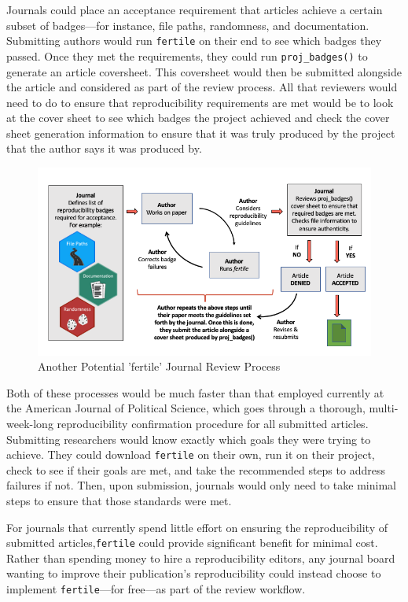 \documentclass[12pt,twoside]{reedthesis}
\begin{document}
Journals could place an acceptance requirement that articles achieve a
certain subset of badges---for instance, file paths, randomness, and
documentation. Submitting authors would run \texttt{fertile} on their
end to see which badges they passed. Once they met the requirements,
they could run \texttt{proj\_badges()} to generate an article
coversheet. This coversheet would then be submitted alongside the
article and considered as part of the review process. All that reviewers
would need to do to ensure that reproducibility requirements are met
would be to look at the cover sheet to see which badges the project
achieved and check the cover sheet generation information to ensure that
it was truly produced by the project that the author says it was
produced by.
\begin{figure}
\includegraphics[width=1\linewidth]{figure/journal-process-2} \caption{Another Potential 'fertile' Journal Review Process}\label{fig:unnamed-chunk-44}
\end{figure}
Both of these processes would be much faster than that employed
currently at the American Journal of Political Science, which goes
through a thorough, multi-week-long reproducibility confirmation
procedure for all submitted articles. Submitting researchers would know
exactly which goals they were trying to achieve. They could download
\texttt{fertile} on their own, run it on their project, check to see if
their goals are met, and take the recommended steps to address failures
if not. Then, upon submission, journals would only need to take minimal
steps to ensure that those standards were met.

For journals that currently spend little effort on ensuring the
reproducibility of submitted articles,\texttt{fertile} could provide
significant benefit for minimal cost. Rather than spending money to hire
a reproducibility editors, any journal board wanting to improve their
publication's reproducibility could instead choose to implement
\texttt{fertile}---for free---as part of the review workflow.
\end{document}
